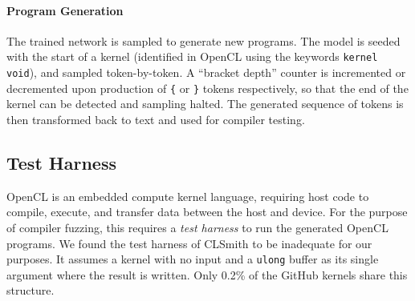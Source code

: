 
\paragraph{Program Generation} The trained network is sampled to generate new programs. The model is seeded with the start of a kernel (identified in OpenCL using the keywords \texttt{kernel void}), and sampled token-by-token. A ``bracket depth'' counter is incremented or decremented upon production of \texttt{\{} or \texttt{\}} tokens respectively, so that the end of the kernel can be detected and sampling halted. The generated sequence of tokens is then transformed back to text and used for compiler testing.


\subsection{Test Harness\label{sec:test-harness}}


OpenCL is an embedded compute kernel language, requiring host code to compile, execute, and transfer data between the host and device. For the purpose of compiler fuzzing, this requires a \emph{test harness} to run the generated OpenCL programs. We found the test harness of CLSmith to be inadequate for our purposes. It assumes a kernel with no input and a \texttt{ulong} buffer as its single argument where the result is written. Only 0.2\% of the GitHub kernels share this structure. 

